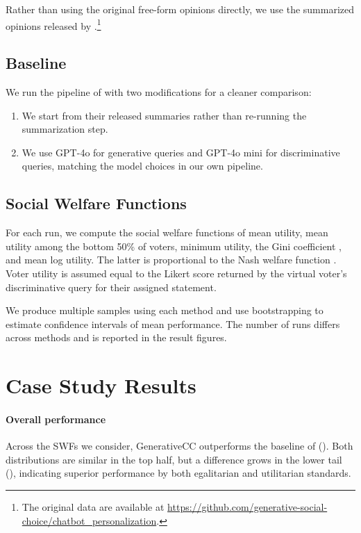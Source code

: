 \documentclass[letterpaper]{article} %
\begin{document}
Rather than using the original free-form opinions directly, we use the summarized opinions released by \citet{fish-v2}.\footnote{The original data are available at \url{https://github.com/generative-social-choice/chatbot_personalization}.}

\subsection{Baseline}

We run the pipeline of \citet{fish-v2} with two modifications for a cleaner comparison:
\begin{enumerate}
    \item We start from their released summaries rather than re-running the summarization step.
    \item We use GPT-4o for generative queries and GPT-4o mini for discriminative queries, matching the model choices in our own pipeline.
\end{enumerate}

\subsection{Social Welfare Functions}
\label{sec:metrics}

For each run, we compute the social welfare functions of mean utility, mean utility among the bottom 50\% of voters, minimum utility, the Gini coefficient \citep{gini}, and mean log utility.
The latter is proportional to the Nash welfare function \citep{nash-welfare}.
Voter utility is assumed equal to the Likert score returned by the virtual voter's discriminative query for their assigned statement.

We produce multiple samples using each method and use bootstrapping to estimate confidence intervals of mean performance.
The number of runs differs across methods and is reported in the result figures.

\section{Case Study Results}

\paragraph{Overall performance}
Across the SWFs we consider, GenerativeCC outperforms the baseline of \citet{fish-v2} ().
Both distributions are similar in the top half, but a difference grows in the lower tail (), indicating superior performance by both egalitarian and utilitarian standards.
\end{document}
